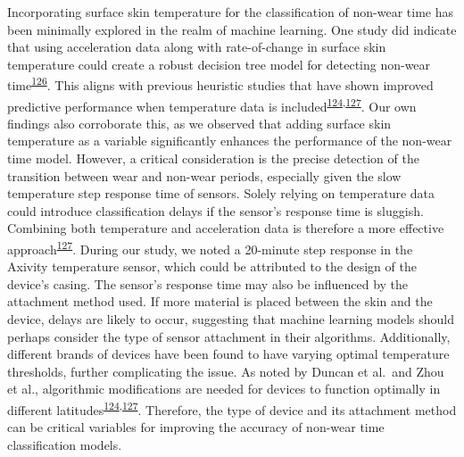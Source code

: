 \documentclass[
  9pt,
]{scrbook}
\begin{document}
Incorporating surface skin temperature for the classification of
non-wear time has been minimally explored in the realm of machine
learning. One study did indicate that using acceleration data along with
rate-of-change in surface skin temperature could create a robust
decision tree model for detecting non-wear
time\textsuperscript{\protect\hyperlink{ref-vert_detecting_2022}{126}}.
This aligns with previous heuristic studies that have shown improved
predictive performance when temperature data is
included\textsuperscript{\protect\hyperlink{ref-duncan_wear-time_2018}{124},\protect\hyperlink{ref-zhou_classification_2015}{127}}.
Our own findings also corroborate this, as we observed that adding
surface skin temperature as a variable significantly enhances the
performance of the non-wear time model. However, a critical
consideration is the precise detection of the transition between wear
and non-wear periods, especially given the slow temperature step
response time of sensors. Solely relying on temperature data could
introduce classification delays if the sensor's response time is
sluggish. Combining both temperature and acceleration data is therefore
a more effective
approach\textsuperscript{\protect\hyperlink{ref-zhou_classification_2015}{127}}.
During our study, we noted a 20-minute step response in the Axivity
temperature sensor, which could be attributed to the design of the
device's casing. The sensor's response time may also be influenced by
the attachment method used. If more material is placed between the skin
and the device, delays are likely to occur, suggesting that machine
learning models should perhaps consider the type of sensor attachment in
their algorithms. Additionally, different brands of devices have been
found to have varying optimal temperature thresholds, further
complicating the issue. As noted by Duncan et al.~and Zhou et al.,
algorithmic modifications are needed for devices to function optimally
in different
latitudes\textsuperscript{\protect\hyperlink{ref-duncan_wear-time_2018}{124},\protect\hyperlink{ref-zhou_classification_2015}{127}}.
Therefore, the type of device and its attachment method can be critical
variables for improving the accuracy of non-wear time classification
models.
\end{document}
